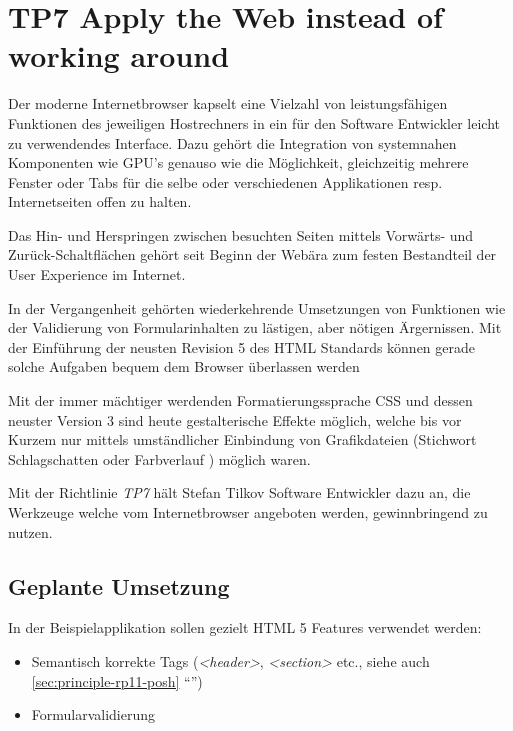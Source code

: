 \section{TP7 Apply the Web instead of working around}
\label{sec:principle-tp7-apply-the-web}

Der moderne Internetbrowser kapselt eine Vielzahl von leistungsfähigen Funktionen des jeweiligen Hostrechners in ein für den Software Entwickler leicht zu verwendendes Interface. Dazu gehört die Integration von systemnahen Komponenten wie \gls{GPU}'s \cite{webgl} genauso wie die Möglichkeit, gleichzeitig mehrere Fenster oder Tabs für die selbe oder verschiedenen Applikationen resp. Internetseiten offen zu halten.

Das Hin- und Herspringen zwischen besuchten Seiten mittels Vorwärts- und Zurück-Schaltflächen gehört seit Beginn der Webära zum festen Bestandteil der User Experience im Internet.

In der Vergangenheit gehörten wiederkehrende Umsetzungen von Funktionen wie der Validierung von Formularinhalten zu lästigen, aber nötigen Ärgernissen. Mit der Einführung der neusten Revision 5 des HTML Standards können gerade solche Aufgaben bequem dem Browser \cite{HTML5Forms} überlassen werden

Mit der immer mächtiger werdenden Formatierungssprache CSS und dessen neuster Version 3 sind heute gestalterische Effekte möglich, welche bis vor Kurzem nur mittels umständlicher Einbindung von Grafikdateien (Stichwort Schlagschatten \cite{css-box-shadow} oder Farbverlauf \cite{css-gradient}) möglich waren.

Mit der Richtlinie \emph{TP7} hält Stefan Tilkov Software Entwickler dazu an, die Werkzeuge welche vom Internetbrowser angeboten werden, gewinnbringend zu nutzen.


\subsection*{Geplante Umsetzung}

In der Beispielapplikation sollen gezielt HTML 5 Features verwendet werden:

\begin{itemize}
	\item Semantisch korrekte Tags (\emph{<header>}, \emph{<section>} etc., siehe auch \ref{sec:principle-rp11-posh} ``'')
	\item Formularvalidierung \cite{HTML5Forms}
\end{itemize}

